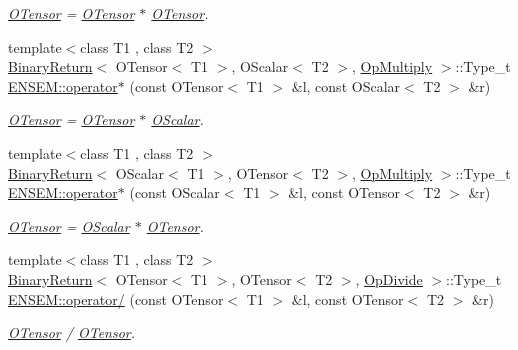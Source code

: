 \begin{DoxyCompactItemize}
\begin{DoxyCompactList}\small\item\em \mbox{\hyperlink{classENSEM_1_1OTensor}{O\+Tensor}} = \mbox{\hyperlink{classENSEM_1_1OTensor}{O\+Tensor}} $\ast$ \mbox{\hyperlink{classENSEM_1_1OTensor}{O\+Tensor}}. \end{DoxyCompactList}\item 
{\footnotesize template$<$class T1 , class T2 $>$ }\\\mbox{\hyperlink{structBinaryReturn}{Binary\+Return}}$<$ O\+Tensor$<$ T1 $>$, O\+Scalar$<$ T2 $>$, \mbox{\hyperlink{structOpMultiply}{Op\+Multiply}} $>$\+::Type\+\_\+t \mbox{\hyperlink{group__obstensor_gad60dc9814d8cddbdf21babfd0bff14c4}{E\+N\+S\+E\+M\+::operator$\ast$}} (const O\+Tensor$<$ T1 $>$ \&l, const O\+Scalar$<$ T2 $>$ \&r)
\begin{DoxyCompactList}\small\item\em \mbox{\hyperlink{classENSEM_1_1OTensor}{O\+Tensor}} = \mbox{\hyperlink{classENSEM_1_1OTensor}{O\+Tensor}} $\ast$ \mbox{\hyperlink{classENSEM_1_1OScalar}{O\+Scalar}}. \end{DoxyCompactList}\item 
{\footnotesize template$<$class T1 , class T2 $>$ }\\\mbox{\hyperlink{structBinaryReturn}{Binary\+Return}}$<$ O\+Scalar$<$ T1 $>$, O\+Tensor$<$ T2 $>$, \mbox{\hyperlink{structOpMultiply}{Op\+Multiply}} $>$\+::Type\+\_\+t \mbox{\hyperlink{group__obstensor_gacf15f85a2bbaf20f2ccb489bd28690c6}{E\+N\+S\+E\+M\+::operator$\ast$}} (const O\+Scalar$<$ T1 $>$ \&l, const O\+Tensor$<$ T2 $>$ \&r)
\begin{DoxyCompactList}\small\item\em \mbox{\hyperlink{classENSEM_1_1OTensor}{O\+Tensor}} = \mbox{\hyperlink{classENSEM_1_1OScalar}{O\+Scalar}} $\ast$ \mbox{\hyperlink{classENSEM_1_1OTensor}{O\+Tensor}}. \end{DoxyCompactList}\item 
{\footnotesize template$<$class T1 , class T2 $>$ }\\\mbox{\hyperlink{structBinaryReturn}{Binary\+Return}}$<$ O\+Tensor$<$ T1 $>$, O\+Tensor$<$ T2 $>$, \mbox{\hyperlink{structOpDivide}{Op\+Divide}} $>$\+::Type\+\_\+t \mbox{\hyperlink{group__obstensor_gab78687abe74ea9ae63cc1a98de644b13}{E\+N\+S\+E\+M\+::operator/}} (const O\+Tensor$<$ T1 $>$ \&l, const O\+Tensor$<$ T2 $>$ \&r)
\begin{DoxyCompactList}\small\item\em \mbox{\hyperlink{classENSEM_1_1OTensor}{O\+Tensor}} / \mbox{\hyperlink{classENSEM_1_1OTensor}{O\+Tensor}}. \end{DoxyCompactList}\item 

\end{DoxyCompactItemize}
